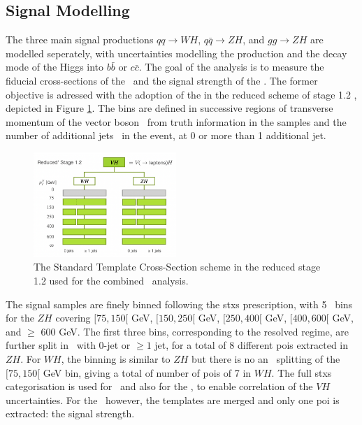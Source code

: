 \subsection{Signal Modelling}\label{sec-modSignal}
The three main signal productions $qq \rightarrow WH$, $q\bar{q} \rightarrow ZH$, and $gg \rightarrow ZH$ are modelled seperately, with uncertainties modelling the production and the decay mode of the Higgs into $b\bar{b}$ or $c\bar{c}$. The goal of the analysis is to measure the fiducial cross-sections of the \vhb\ and the signal strength of the \vhc. The former objective is adressed with the adoption of the  in the reduced scheme of stage 1.2 \cite{badger2016les, berger2019simplified}, depicted in Figure \ref{fig:model-stxsscheme}. The bins are defined in successive regions of transverse momentum of the vector boson \ptv\ from truth information in the samples and the number of additional jets \nj\ in the event, at 0 or more than 1 additional jet.
  
  \begin{figure}[!htbp]
    \centering
    \includegraphics[width=0.48\textwidth]{Images/VH/Model/STXSsketch.png}
    \caption{The Standard Template Cross-Section scheme in the reduced stage 1.2 used for the combined \vhbc\ analysis.}
    \label{fig:model-stxsscheme}
  \end{figure}

The signal samples are finely binned following the \gls{stxs} prescription, with 5 \ptv\ bins for the $ZH$ covering $[75, 150[$ GeV, $[150, 250[$ GeV, $[250, 400[$ GeV, $[400, 600[$ GeV, and $\geq$ 600 GeV. The first three bins, corresponding to the resolved regime, are further split in \nj\ with 0-jet or $\geq 1$ jet, for a total of 8 different \gls{poi}s extracted in $ZH$. For $WH$, the binning is similar to $ZH$ but there is no an \nj\ splitting of the $[75, 150[$ GeV bin, giving a total of number of \gls{poi}s of 7 in $WH$. The full \gls{stxs} categorisation is used for \vhb\ and also for the \vhc, to enable correlation of the $VH$ uncertainties. For the \vhc\ however, the templates are merged and only one \gls{poi} is extracted: the signal strength.\\
  
